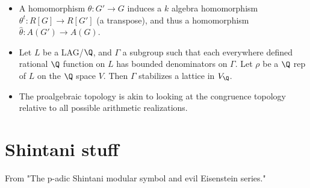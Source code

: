 \documentclass[11pt]{amsart}
\begin{document}
\begin{itemize}
	\item A homomorphism $\theta:G'\to G$ induces a $k$ algebra homomorphism $\theta^t:R[G]\to R[G']$ (a transpose), and thus a homomorphism $\hat{\theta}:A(G') \to A(G)$. 
	\item Let $L$ be a LAG/$\Q$, and $\Gamma$ a subgroup such that each everywhere defined rational $\Q$ function on $L$ has bounded denominators on $\Gamma$. Let $\rho$ be a $\Q$ rep of $L$ on the $\Q$ space $V$. Then $\Gamma$ stabilizes a lattice in $V_\Q$. 
	\item The proalgebraic topology is akin to looking at the congruence topology relative to all possible arithmetic realizations. 
\end{itemize}
\section{Shintani stuff}
From "The p-adic Shintani modular symbol and evil Eisenstein series." 
\end{document}
